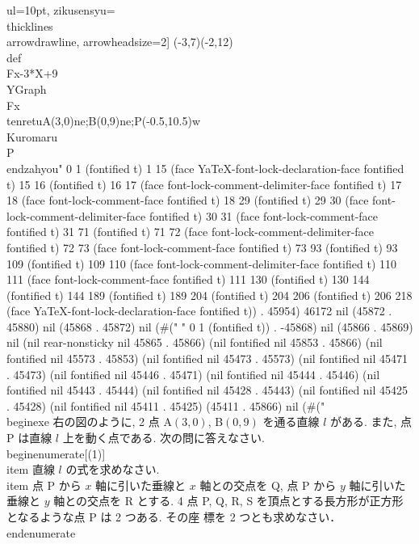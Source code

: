    ul=10pt,%
   zikusensyu=\\thicklines\\arrowdrawline,%
   arrowheadsize=2]
   (-3,7)(-2,12)%
   \\def\\Fx{-3*X+9}
   \\YGraph\\Fx
   \\tenretu{A(3,0)ne;B(0,9)ne;P(-0.5,10.5)w}
   \\Kuromaru\\P
  \\end{zahyou}" 0 1 (fontified t) 1 15 (face YaTeX-font-lock-declaration-face fontified t) 15 16 (fontified t) 16 17 (face font-lock-comment-delimiter-face fontified t) 17 18 (face font-lock-comment-face fontified t) 18 29 (fontified t) 29 30 (face font-lock-comment-delimiter-face fontified t) 30 31 (face font-lock-comment-face fontified t) 31 71 (fontified t) 71 72 (face font-lock-comment-delimiter-face fontified t) 72 73 (face font-lock-comment-face fontified t) 73 93 (fontified t) 93 109 (fontified t) 109 110 (face font-lock-comment-delimiter-face fontified t) 110 111 (face font-lock-comment-face fontified t) 111 130 (fontified t) 130 144 (fontified t) 144 189 (fontified t) 189 204 (fontified t) 204 206 (fontified t) 206 218 (face YaTeX-font-lock-declaration-face fontified t)) . 45954) 46172 nil (45872 . 45880) nil (45868 . 45872) nil (#(" " 0 1 (fontified t)) . -45868) nil (45866 . 45869) nil (nil rear-nonsticky nil 45865 . 45866) (nil fontified nil 45853 . 45866) (nil fontified nil 45573 . 45853) (nil fontified nil 45473 . 45573) (nil fontified nil 45471 . 45473) (nil fontified nil 45446 . 45471) (nil fontified nil 45444 . 45446) (nil fontified nil 45443 . 45444) (nil fontified nil 45428 . 45443) (nil fontified nil 45425 . 45428) (nil fontified nil 45411 . 45425) (45411 . 45866) nil (#("\\begin{exe}
  右の図のように, 2 点 A$(3,0)$, B$(0,9)$ を通る直線 $l$ がある. また,
  点 P は直線 $l$ 上を動く点である. 次の問に答えなさい.
  \\begin{enumerate}[(1)]
   \\item 直線 $l$ の式を求めなさい.
   \\item 点 P から $x$ 軸に引いた垂線と $x$ 軸との交点を Q, 点 P から
         $y$ 軸に引いた垂線と $y$ 軸との交点を R とする. 4 点 P, Q, R, S
         を頂点とする長方形が正方形となるような点 P は 2 つある. その座
         標を 2 つとも求めなさい．
  \\end{enumerate}
